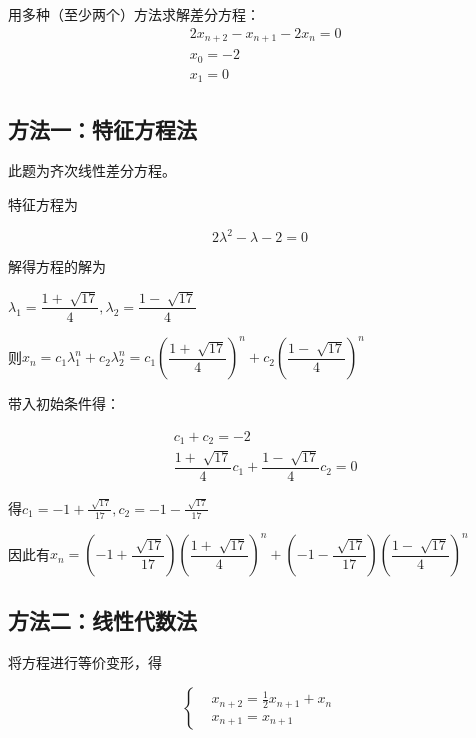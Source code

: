 \chapter{}

用多种（至少两个）方法求解差分方程：
\begin{equation*}
    \begin{split}
        &2x_{n+2} - x_{n+1} - 2x_n = 0\\
        &x_0 = -2\\
        &x_1 = 0
    \end{split}
\end{equation*}
\section{方法一：特征方程法}
此题为齐次线性差分方程。

特征方程为

\begin{equation}
    2\lambda^2-\lambda-2=0
\end{equation}

解得方程的解为

$\lambda_1 = \dfrac{1+\sqrt[]{17}}{4}, \lambda_2 = \dfrac{1-\sqrt[]{17}}{4} $

则$x_n=c_1\lambda_1^n + c_2\lambda_2^n = c_1(\dfrac{1+\sqrt[]{17}}{4})^n + c_2(\dfrac{1-\sqrt[]{17}}{4})^n$


带入初始条件得：

\begin{equation}
    \begin{aligned}
        &c_1+c_2=-2\\
        &\dfrac{1+\sqrt[]{17}}{4}c_1 + \dfrac{1-\sqrt[]{17}}{4}c_2 = 0
    \end{aligned}
\end{equation}

得$c_1=-1+\frac{\sqrt[]{17}}{17}, c_2=-1-\frac{\sqrt[]{17}}{17}$

因此有$x_n = (-1+\dfrac{\sqrt[]{17}}{17})(\dfrac{1+\sqrt[]{17}}{4})^n+(-1-\dfrac{\sqrt[]{17}}{17})( \dfrac{1-\sqrt[]{17}}{4} )^n$


\section{方法二：线性代数法}

将方程进行等价变形，得

\begin{equation}
    \left \{
        \begin{aligned}
        &x_{n+2} = \frac{1}{2}x_{n+1} + x_n\\
        &x_{n+1} = x_{n+1}
        \end{aligned}
    \right .
\end{equation}

